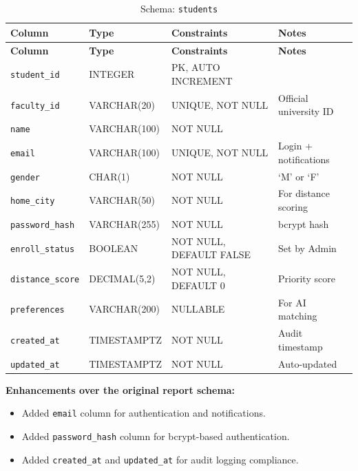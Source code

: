 \documentclass[12pt,a4paper]{article}
\begin{document}
\begin{longtable}{@{}llll@{}}
\caption{Schema: \texttt{students}} \\
\toprule
\textbf{Column} & \textbf{Type} & \textbf{Constraints} & \textbf{Notes} \\ \midrule
\endfirsthead
\toprule
\textbf{Column} & \textbf{Type} & \textbf{Constraints} & \textbf{Notes} \\ \midrule
\endhead
\texttt{student\_id}      & INTEGER       & PK, AUTO INCREMENT  &                           \\
\texttt{faculty\_id}      & VARCHAR(20)   & UNIQUE, NOT NULL     & Official university ID    \\
\texttt{name}              & VARCHAR(100)  & NOT NULL             &                           \\
\texttt{email}             & VARCHAR(100)  & UNIQUE, NOT NULL     & Login + notifications     \\
\texttt{gender}            & CHAR(1)       & NOT NULL             & `M' or `F'                \\
\texttt{home\_city}        & VARCHAR(50)   & NOT NULL             & For distance scoring      \\
\texttt{password\_hash}    & VARCHAR(255)  & NOT NULL             & bcrypt hash               \\
\texttt{enroll\_status}    & BOOLEAN       & NOT NULL, DEFAULT FALSE & Set by Admin           \\
\texttt{distance\_score}   & DECIMAL(5,2)  & NOT NULL, DEFAULT 0  & Priority score            \\
\texttt{preferences}       & VARCHAR(200)  & NULLABLE             & For AI matching           \\
\texttt{created\_at}       & TIMESTAMPTZ   & NOT NULL             & Audit timestamp           \\
\texttt{updated\_at}       & TIMESTAMPTZ   & NOT NULL             & Auto-updated              \\
\bottomrule
\end{longtable}

\textbf{Enhancements over the original report schema:}
\begin{itemize}[noitemsep]
    \item Added \texttt{email} column for authentication and notifications.
    \item Added \texttt{password\_hash} column for bcrypt-based authentication.
    \item Added \texttt{created\_at} and \texttt{updated\_at} for audit logging compliance.
\end{itemize}
\end{document}
